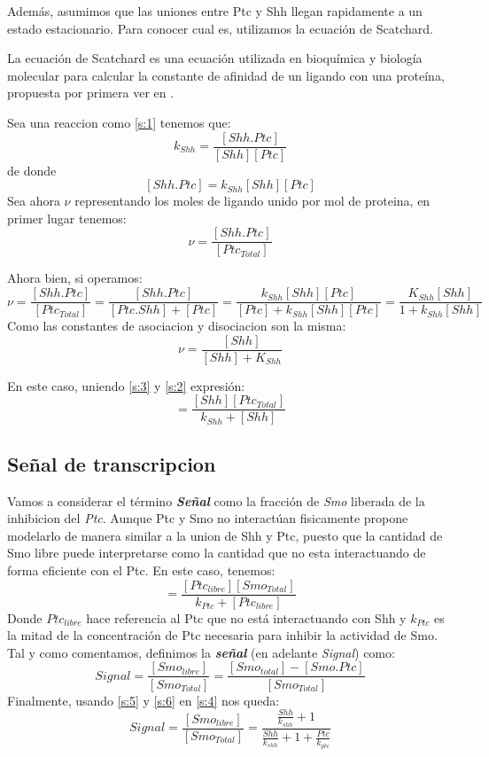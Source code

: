  Además, asumimos que las uniones entre Ptc y Shh llegan rapidamente a un estado estacionario. Para conocer cual es, utilizamos la ecuación de Scatchard.
 
 La ecuación de Scatchard es una ecuación utilizada en bioquímica y biología molecular para calcular la constante de afinidad de un ligando con una proteína, propuesta por primera ver en \cite{scatchard1949attractions}. 
 
 Sea una reaccion como \ref{s:1} tenemos que: 
 $$k_{Shh}=\frac{[Shh.Ptc]}{[Shh][Ptc]}$$
 de donde 
 $$[Shh.Ptc]=k_{Shh}[Shh][Ptc]$$
 Sea ahora $\nu$ representando los moles de ligando unido por mol de proteina, en primer lugar tenemos:
 \begin{equation}
 \nu=\frac{[Shh.Ptc]}{[Ptc_{Total}]}
 \label{s:2}
 \end{equation}
 
 Ahora bien, si operamos:
 $$\nu=\frac{[Shh.Ptc]}{[Ptc_{Total}]}=\frac{[Shh.Ptc]}{[Ptc.Shh]+[Ptc]}=\frac{k_{Shh}[Shh][Ptc]}{[Ptc]+k_{Shh}[Shh][Ptc]}=\frac{K_{Shh}[Shh]}{1+k_{Shh}[Shh]}$$
 Como las constantes de asociacion y disociacion son la misma: \begin{equation}
 \nu=\frac{[Shh]}{[Shh]+K_{Shh}}
 \label{s:3}
 \end{equation}
 
 En este caso, uniendo \ref{s:3} y \ref{s:2} expresión: 
 \begin{equation}
 [Shh.Ptc]=\frac{[Shh][Ptc_{Total}]}{k_{Shh}+[Shh]}
 \label{s:6}
 \end{equation}
 
 \subsection{Señal de transcripcion}
 Vamos a considerar el término \textbf{\textit{Señal}} como la fracción de \textit{Smo} liberada de la inhibicion del \textit{Ptc}. Aunque Ptc y Smo no interactúan fisicamente \cite{schaffer} propone modelarlo de manera similar a la union de Shh y Ptc, puesto que la cantidad de Smo libre puede interpretarse como la cantidad que no esta interactuando de forma eficiente con el Ptc.
 En este caso, tenemos:
 \begin{equation}
 [Shh.Ptc]=\frac{[Ptc_{libre}][Smo_{Total}]}{k_{Ptc}+[Ptc_{libre}]}
 \label{s:5}
 \end{equation}
 Donde $Ptc_{libre}$ hace referencia al Ptc que no está interactuando con Shh y $k_{Ptc}$ es la mitad de la concentración de Ptc necesaria para inhibir la actividad de Smo.
 Tal y como comentamos, definimos la \textbf{\textit{señal}} (en adelante \textit{Signal}) como:
 \begin{equation}
 Signal=\frac{[Smo_{libre}]}{[Smo_{Total}]}=\frac{[Smo_{total}]-[Smo.Ptc]}{[Smo_{Total}]}
 \label{s:4}
 \end{equation}
 Finalmente, usando \ref{s:5} y \ref{s:6} en \ref{s:4} nos queda:
 \begin{equation}
 Signal=\frac{[Smo_{libre}]}{[Smo_{Total}]}=\frac{\frac{Shh}{k_{shh}} + 1}{\frac{Shh}{k_{shh}} + 1 + \frac{Ptc}{k_{ptc}}}
 \label{s:7}
 \end{equation}
 
